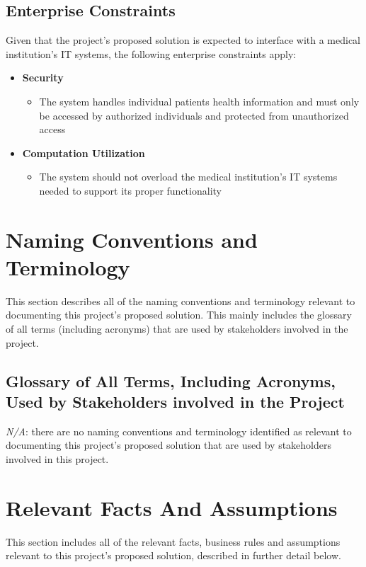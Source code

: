 \documentclass[12pt]{article}
\begin{document}
\subsection{Enterprise Constraints}
Given that the project’s proposed solution is expected to interface with a medical institution’s IT systems, the following enterprise constraints apply:
\begin{itemize}
    \item \textbf{Security}
    \begin{itemize}
        \item The system handles individual patients health information and must only be accessed by authorized individuals and protected from unauthorized access
    \end{itemize}
    \item \textbf{Computation Utilization}
    \begin{itemize}
        \item The system should not overload the medical institution's IT systems needed to support its proper functionality
    \end{itemize}
\end{itemize}

\section{Naming Conventions and Terminology}
This section describes all of the naming conventions and terminology relevant to documenting this project's proposed solution. This mainly includes the glossary of all terms (including acronyms) that are used by stakeholders involved in the project.

\subsection{Glossary of All Terms, Including Acronyms, Used by Stakeholders
involved in the Project}
\textit{N/A}: there are no naming conventions and terminology identified as relevant to documenting this project's proposed solution that are used by stakeholders involved in this project.

\section{Relevant Facts And Assumptions}
This section includes all of the relevant facts, business rules and assumptions relevant to this project's proposed solution, described in further detail below.
\end{document}
